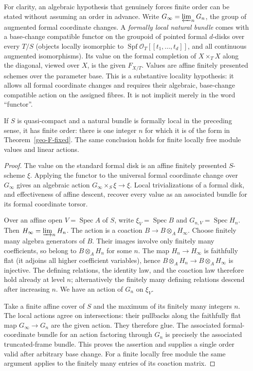 For clarity, an algebraic hypothesis that genuinely forces finite order can
be stated without assuming an order in advance. Write
$G_\infty=\varprojlim_nG_n$, the group of augmented formal coordinate
changes. A \emph{formally local natural bundle} comes with a base-change
compatible functor on the groupoid of pointed formal $d$-disks over every
$T/S$ (objects locally isomorphic to
$\operatorname{Spf}\mathcal O_T[[t_1,\ldots,t_d]]$, and all continuous
augmented isomorphisms). Its value on the formal completion of
$X\times_T X$ along the diagonal, viewed over $X$, is the given $F_{X/T}$.
Values are affine finitely presented schemes over the parameter base.
This is a substantive locality hypothesis: it allows all formal coordinate
changes and requires their algebraic, base-change compatible action on the
assigned fibres. It is not implicit merely in the word ``functor''.

\begin{theorem}
\label{geo-F-finite}
If $S$ is quasi-compact and a natural bundle is formally local in the
preceding sense, it has finite order: there is one integer $n$ for which it
is of the form in Theorem~\ref{geo-F-fixed}. The same conclusion holds for
finite locally free module values and linear actions.
\end{theorem}
\begin{proof}
The value on the standard formal disk is an affine finitely presented
$S$-scheme $\xi$. Applying the functor to the universal formal coordinate
change over $G_\infty$ gives an algebraic action
$G_\infty\times_S\xi\to\xi$. Local trivializations of a formal disk,
and effectiveness of affine descent, recover every value as an associated
bundle for its formal coordinate torsor.

Over an affine open $V=\operatorname{Spec}A$ of $S$, write
$\xi_V=\operatorname{Spec}B$ and $G_{n,V}=\operatorname{Spec}H_n$.
Then $H_\infty=\varinjlim_nH_n$. The action is a coaction
$B\to B\otimes_AH_\infty$. Choose finitely many algebra generators of
$B$. Their images involve only finitely many coefficients, so belong to
$B\otimes_AH_n$ for some $n$. The map $H_n\to H_\infty$ is faithfully
flat (it adjoins all higher coefficient variables), hence
$B\otimes_AH_n\to B\otimes_AH_\infty$ is injective. The defining
relations, the identity law, and the coaction law therefore hold already
at level $n$; alternatively the finitely many defining relations descend
after increasing $n$. We have an action of $G_n$ on $\xi_V$.

Take a finite affine cover of $S$ and the maximum of its finitely many
integers $n$. The local actions agree on intersections: their pullbacks
along the faithfully flat map $G_\infty\to G_n$ are the given action.
They therefore glue. The associated formal-coordinate bundle for an action
factoring through $G_n$ is precisely the associated truncated-frame bundle.
This proves the assertion and supplies a single order valid after arbitrary
base change. For a finite locally free module the same argument applies to
the finitely many entries of its coaction matrix.
\end{proof}

